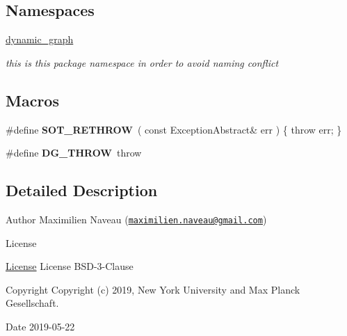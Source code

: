 \subsection*{Namespaces}
\begin{DoxyCompactItemize}
\item 
 \hyperlink{namespacedynamic__graph}{dynamic\+\_\+graph}
\begin{DoxyCompactList}\small\item\em this is this package namespace in order to avoid naming conflict \end{DoxyCompactList}\end{DoxyCompactItemize}
\subsection*{Macros}
\begin{DoxyCompactItemize}
\item 
\mbox{\label{exception-abstract_8hh_aba67729ca33a61234a4ca01d1e070125}} 
\#define {\bfseries S\+O\+T\+\_\+\+R\+E\+T\+H\+R\+OW}~( const Exception\+Abstract\& err ) \{ throw err; \}
\item 
\mbox{\label{exception-abstract_8hh_af37158a4ed07567f1673457ea2656a34}} 
\#define {\bfseries D\+G\+\_\+\+T\+H\+R\+OW}~throw
\end{DoxyCompactItemize}


\subsection{Detailed Description}
\begin{DoxyAuthor}{Author}
Maximilien Naveau (\href{mailto:maximilien.naveau@gmail.com}{\tt maximilien.\+naveau@gmail.\+com}) 
\end{DoxyAuthor}
\begin{DoxyRefDesc}{License}
\item[\hyperlink{license__license000006}{License}]License B\+S\+D-\/3-\/\+Clause \end{DoxyRefDesc}
\begin{DoxyCopyright}{Copyright}
Copyright (c) 2019, New York University and Max Planck Gesellschaft. 
\end{DoxyCopyright}
\begin{DoxyDate}{Date}
2019-\/05-\/22 
\end{DoxyDate}
